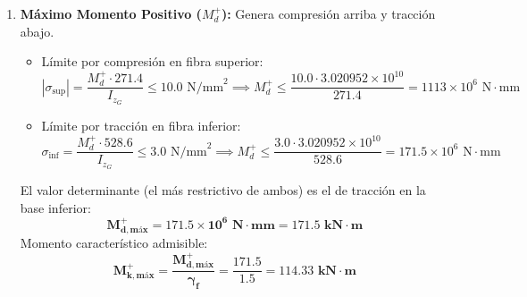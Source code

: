 {    

    \begin{enumerate}[label=\textbf{c.\arabic*)}]
        \item \textbf{Máximo Momento Positivo ($M_d^+$):} Genera compresión arriba y tracción abajo.
              \begin{itemize}
                  \item Límite por compresión en fibra superior:
                        \begin{equation}
                            |\sigma_{\text{sup}}| = \frac{M_d^+ \cdot 271.4}{I_{z_G}} \le 10.0\text{ N/mm}^2 \implies M_d^+ \le \frac{10.0 \cdot 3.020952 \times 10^{10}}{271.4} = 1113 \times 10^6\text{ N}\cdot\text{mm}
                        \end{equation}
                  \item Límite por tracción en fibra inferior:
                        \begin{equation}
                            \sigma_{\text{inf}} = \frac{M_d^+ \cdot 528.6}{I_{z_G}} \le 3.0\text{ N/mm}^2 \implies M_d^+ \le \frac{3.0 \cdot 3.020952 \times 10^{10}}{528.6} = 171.5 \times 10^6\text{ N}\cdot\text{mm}
                        \end{equation}
              \end{itemize}
              El valor determinante (el más restrictivo de ambos) es el de tracción en la base inferior:
              \begin{equation}
                  \mathbf{M_{d,\text{máx}}^+ = 171.5 \times 10^6\text{ N}\cdot\text{mm} = 171.5\text{ kN}\cdot\text{m}}
              \end{equation}
              Momento característico admisible:
              \begin{equation}
                  \mathbf{M_{k,\text{máx}}^+ = \frac{M_{d,\text{máx}}^+}{\gamma_f} = \frac{171.5}{1.5} = \mathbf{114.33\text{ kN}\cdot\text{m}}}
              \end{equation}


\end{enumerate}}
